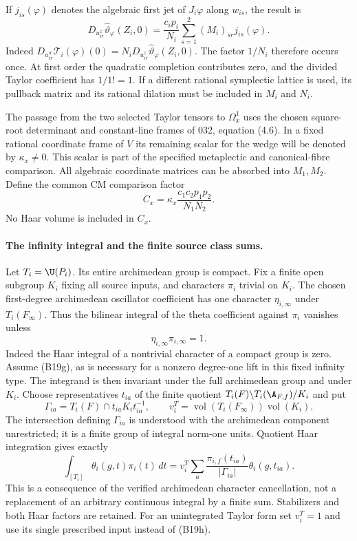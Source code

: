\documentclass[11pt]{article}
\theoremstyle{definition}\newtheorem{definition}[theorem]{Definition}\newtheorem{remark}[theorem]{Remark}
\begin{document}
If $j_{is}(\varphi)$ denotes the algebraic first jet of
$J_i\varphi$ along $w_{is}$, the result is
\begin{equation}\label{B19-jet}
 D_{u^z_{ir}}\widehat\vartheta_{\varphi}(Z_i,0)
   =\frac{c_ip_i}{N_i}
        \sum_{s=1}^2(M_i)_{sr}j_{is}(\varphi).
 \tag{B19e}
\end{equation}
Indeed $D_{u^w_{ir}}\mathcal T_i(\varphi)(0)
=N_iD_{u^z_{ir}}\widehat\vartheta_{\varphi}(Z_i,0)$.
The factor $1/N_i$ therefore occurs once.  At first order the
quadratic completion contributes zero, and the divided Taylor
coefficient has $1/1!=1$.  If a different rational symplectic
lattice is used, its pullback matrix and its rational dilation
must be included in $M_i$ and $N_i$.

The passage from the two selected Taylor tensors to
$\Omega_x^1$ uses the chosen square-root determinant and
constant-line frames of 032, equation (4.6).  In a fixed rational
coordinate frame of $V$ its remaining scalar for the wedge will
be denoted by $\kappa_x\ne0$.  This scalar is part of the
specified metaplectic and canonical-fibre comparison.  All
algebraic coordinate matrices can be absorbed into $M_1,M_2$.
Define the common CM comparison factor
\[
 C_x=\kappa_x\frac{c_1c_2p_1p_2}{N_1N_2}.
 \tag{B19f}
\]
No Haar volume is included in $C_x$.

\paragraph{The infinity integral and the finite source class sums.}
Let $T_i=\U(P_i)$.  Its entire archimedean group is compact.
Fix a finite open subgroup $K_i$ fixing all source inputs, and
characters $\pi_i$ trivial on $K_i$.  The chosen first-degree
archimedean oscillator coefficient has one character
$\eta_{i,\infty}$ under $T_i(F_\infty)$.  Thus the bilinear
integral of the theta coefficient against $\pi_i$ vanishes unless
\[
                    \eta_{i,\infty}\pi_{i,\infty}=1.
 \tag{B19g}
\]
Indeed the Haar integral of a nontrivial character of a compact
group is zero.  Assume (B19g), as is necessary for a nonzero
degree-one lift in this fixed infinity type.  The integrand is
then invariant under the full archimedean group and under $K_i$.
Choose representatives $t_{ia}$ of the finite quotient
$T_i(F)\backslash T_i(\A_{F,f})/K_i$ and put
\[
 \Gamma_{ia}=T_i(F)\cap t_{ia}K_it_{ia}^{-1},\qquad
 v_i^T=\operatorname{vol}(T_i(F_\infty))\operatorname{vol}(K_i).
\]
The intersection defining $\Gamma_{ia}$ is understood with the
archimedean component unrestricted; it is a finite group of
integral norm-one units.  Quotient Haar integration gives exactly
\[
 \int_{[T_i]}\theta_i(g,t)\pi_i(t)\,dt
  =v_i^T\sum_a\frac{\pi_{i,f}(t_{ia})}{|\Gamma_{ia}|}
                      \theta_i(g,t_{ia}).
 \tag{B19h}
\]
This is a consequence of the verified archimedean character
cancellation, not a replacement of an arbitrary continuous
integral by a finite sum.  Stabilizers and both Haar factors are
retained.  For an unintegrated Taylor form set $v_i^T=1$ and
use its single prescribed input instead of (B19h).
\end{document}
